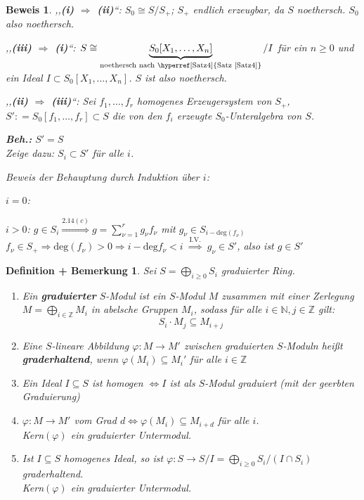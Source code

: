 \documentclass[a4paper,12pt]{scrbook}
\theoremstyle{break}
\newtheorem{DefBem}[Def]{Definition + Bemerkung}
\theoremstyle{nonumberbreak}
\newtheorem{Bew}{Beweis}
\theoremstyle{nonumberplain}
\newcommand{\emp}[1]{\textbf{\emph{#1}}}
\newcommand{\defeqr}[0]{\mathrel{\mathop:}=}
\newcommand{\myref}[2]{%
\hyperref[#2]{#1~\ref*{#2}}%
}
\begin{document}
\begin{Bew}
,,\textbf{(i) $\Rightarrow$ (ii)}``: $S_0\cong S/S_{+}$; $S_{+}$ endlich erzeugbar, da $S$ noethersch.
$S_0$ also noethersch.

,,\textbf{(iii) $\Rightarrow$ (i)}``: $S\cong \underbrace{S_0[X_1, \ldots, X_n]}_
{\textrm{noethersch nach \myref{Satz}{Satz4}}}/I$ für ein $n\geq 0$
und ein Ideal $I\subset S_0[X_1, \ldots, X_n]$. $S$ ist also noethersch.

,,\textbf{(ii) $\Rightarrow$ (iii)}``: Sei $f_1, \ldots, f_r$ homogenes Erzeugersystem von $S_+$, 
$S'\defeqr S_0[f_1, \ldots, f_r]\subset S$ die von den $f_i$ erzeugte
$S_0$-Unteralgebra von $S$.

\textbf{Beh.:} $S' = S$\\
Zeige dazu: $S_i\subset S'$ für alle $i$.

Beweis der Behauptung durch Induktion über $i$:

$i=0$: \checkmark

$i> 0$: $g\in S_i\stackrel{2.14(c)}{\Rightarrow}g=\sum_{\nu=1}^{r} g_{\nu}f_\nu$ mit
$g_\nu\in S_{i-\textrm{deg}(f_\nu)}$\\
$f_\nu\in S_{+} \Rightarrow \textrm{deg}(f_\nu)> 0 \Rightarrow i-\textrm{deg} f_\nu < i$
$\overset{\text{I.V.}}{\Longrightarrow}$ $g_\nu\in S'$, also ist $g\in S'$

\end{Bew}

\begin{DefBem}
\label{2.16} Sei $S=\bigoplus_{i\geq 0}S_i$ graduierter Ring.
\begin{enumerate}

\item Ein \emp{graduierter} $S$-Modul ist ein $S$-Modul $M$ zusammen mit
einer Zerlegung $M=\bigoplus_{i\in\mathbb{Z}} M_i$ in abelsche Gruppen $M_i$,
sodass für alle $i\in\mathbb{N}, j\in\mathbb{Z}$  gilt:
$$S_i\cdot M_j\subseteq M_{i+j}$$

\item Eine $S$-lineare Abbildung $\varphi:M\to M'$ zwischen graduierten $S$-Moduln
heißt \emp{graderhaltend}, wenn $\varphi(M_i)\subseteq
M_i'$ für alle $i\in \mathbb{Z}$

\item Ein Ideal $I\subseteq S$ ist homogen $\Leftrightarrow I$ ist als $S$-Modul
graduiert (mit der geerbten Graduierung)

\item $\varphi: M \to M'$ vom Grad $d \Leftrightarrow \varphi(M_i) \subseteq
      M_{i+d}$ für alle $i$.\\
      Kern$(\varphi)$ ein graduierter Untermodul.
      
\item Ist $I \subseteq S$ homogenes Ideal, so ist $\varphi: S \to S/I =
\bigoplus_{i \ge 0} S_i / (I \cap S_i)$ graderhaltend.\\
Kern$(\varphi)$ ein graduierter Untermodul.

\end{enumerate}
\end{DefBem}
\end{document}
